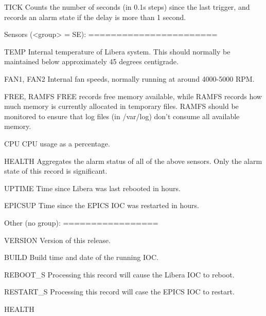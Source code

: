 \documentclass[a4paper,fleqn]{article}
\begin{document}
    TICK
        Counts the number of seconds (in 0.1s steps) since the last trigger,
        and records an alarm state if the delay is more than 1 second.



Sensors (<group> = SE):
=======================

    TEMP
        Internal temperature of Libera system.  This should normally be
        maintained below approximately 45 degrees centigrade.

    FAN1, FAN2
        Internal fan speeds, normally running at around 4000-5000 RPM.

    FREE, RAMFS
        FREE records free memory available, while RAMFS records how much
        memory is currently allocated in temporary files.  RAMFS should be
        monitored to ensure that log files (in /var/log) don't consume all
        available memory.

    CPU
        CPU usage as a percentage.

    HEALTH
        Aggregates the alarm status of all of the above sensors.  Only the
        alarm state of this record is significant.
        
    UPTIME
        Time since Libera was last rebooted in hours.

    EPICSUP
        Time since the EPICS IOC was restarted in hours.



Other (no group):
=================

    VERSION
        Version of this release.

    BUILD
        Build time and date of the running IOC.

    REBOOT\_S
        Processing this record will cause the Libera IOC to reboot.

    RESTART\_S
        Processing this record will case the EPICS IOC to restart.

    HEALTH
\end{document}
